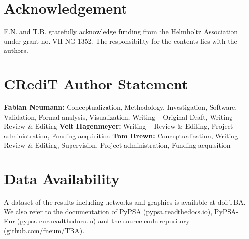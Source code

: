 \documentclass[1p]{elsarticle}
\begin{document}


\section*{Acknowledgement}

F.N. and T.B. gratefully acknowledge funding from the Helmholtz
Association under grant no. VH-NG-1352.
The responsibility for the contents lies with the authors.
\doclicenseLongText
\doclicenseIcon

\section*{CRediT Author Statement}

\textbf{Fabian Neumann:} Conceptualization, Methodology, Investigation, Software, Validation, Formal analysis, Visualization, Writing -- Original Draft, Writing -- Review \& Editing
\textbf{Veit Hagenmeyer:} Writing -- Review \& Editing, Project administration, Funding acquisition
\textbf{Tom Brown:} Conceptualization, Writing -- Review \& Editing, Supervision, Project administration, Funding acquisition

\section*{Data Availability}

A dataset of the results including networks and graphics is available at \href{TBA}{doi:TBA}. 
We also refer to the documentation of PyPSA (\href{https://pypsa.readthedocs.io}{pypsa.readthedocs.io}),
PyPSA-Eur (\href{https://pypsa-eur.readthedocs.io}{pypsa-eur.readthedocs.io}) and the source code 
repository
(\href{https://github.com/fneum/TBA}{github.com/fneum/TBA}).



% 	
\end{document}
